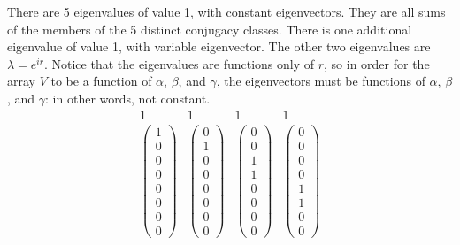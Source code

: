 \documentclass[12pt]{article}
\begin{document}
There are 5 eigenvalues of value 1, with constant eigenvectors.
They are all sums of the members of the 5 distinct conjugacy classes.
There is one additional eigenvalue of value 1, with variable
eigenvector.  The other two eigenvalues are $\lambda = e^{ir}$.
Notice that the eigenvalues are functions only of $r$, so in order
for the array $V$ to be a function of $\alpha$, $\beta$, and $\gamma$,
the eigenvectors must be functions of $\alpha$, $\beta$, and $\gamma$:
in other words, not constant.
\begin{equation}
\begin{array}{c} 1 \\ \left( 
\begin{array}{c} 1 \\ 0 \\ 0 \\ 0 \\ 0 \\ 0 \\ 0 \\ 0 \end{array} \right) \end{array}
\begin{array}{c} 1 \\ \left( 
\begin{array}{c} 0 \\ 1 \\ 0 \\ 0 \\ 0 \\ 0 \\ 0 \\ 0 \end{array} \right) \end{array}
\begin{array}{c} 1 \\ \left( 
\begin{array}{c} 0 \\ 0 \\ 1 \\ 1 \\ 0 \\ 0 \\ 0 \\ 0 \end{array} \right) \end{array}
\begin{array}{c} 1 \\ \left( 
\begin{array}{c} 0 \\ 0 \\ 0 \\ 0 \\ 1 \\ 1 \\ 0 \\ 0 \end{array} \right) \end{array}

\end{equation}
\end{document}
